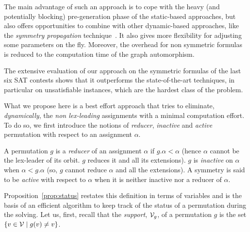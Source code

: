 The main advantage of such an approach is to cope with the heavy (and
potentially blocking) pre-generation phase of the static-based approaches, but
also offers opportunities to combine with other dynamic-based approaches, like
the \textit{symmetry propagation} technique~\cite{Devriendt12}. It also gives
more flexibility for adjusting some parameters on the fly. Moreover, the
overhead for non symmetric formulas is reduced to the computation time of the
graph automorphism.

The extensive evaluation of our approach on the symmetric formulas of the last
six SAT contests shows that it outperforms the state-of-the-art techniques, in
particular on unsatisfiable instances, which are the hardest class of the
problem.



What we propose here is a best effort approach that tries to eliminate,
\textit{dynamically}, the \textit{non lex-leading} assignments with a minimal
computation effort. To do so, we first introduce the notions of
\textit{reducer}, \textit{inactive} and \textit{active} permutation with
respect to an assignment $\alpha$.

\begin{definition} A permutation $g$
	is a \emph{reducer} of an assignment $\alpha$ if $g.\alpha < \alpha$ (hence $\alpha$ cannot be
	the lex-leader of its orbit. $g$ reduces it and all its extensions). $g$ is
	\emph{inactive} on $\alpha$ when $\alpha < g.\alpha$ (so, $g$ cannot reduce $\alpha$ and all
	the extensions). A symmetry is said to be \emph{active} with respect to $\alpha$
	when it is neither inactive nor a reducer of $\alpha$. \end{definition}

Proposition~\ref{prop:status} restates this definition in terms of variables
and is the basis of an efficient algorithm to keep track of the status of a
permutation during the solving. Let us, first, recall that the \emph{support},
$\mathcal{V}_g$, of a permutation $g$ is the set $\{ v \in \mathcal{V} \mid g(v) \neq v\}$.

